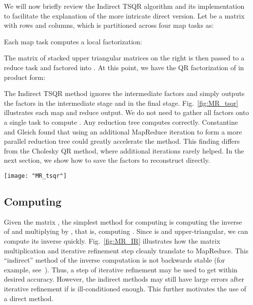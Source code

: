 \documentclass[10pt, conference, compsocconf]{IEEEtran}
\begin{document}
We will now briefly review the Indirect TSQR algorithm and its implementation to facilitate the explanation of the more intricate direct version.  Let  be a matrix with  rows and  columns, which is partitioned across four map tasks as:

Each map task computes a local  factorization:

The matrix of stacked upper triangular matrices on the right is then passed to a reduce task and factored into .  At this point, we have the QR factorization of  in product form: 

The Indirect TSQR method ignores the intermediate  factors and simply outputs the  factors  in the intermediate stage and  in the final stage.  Fig.~\ref{fig:MR_tsqr} illustrates each map and reduce output.  We do not need to gather all  factors onto a single task to compute .  Any reduction tree computes  correctly.  Constantine and Gleich found that using an additional MapReduce iteration to form a more parallel reduction tree could greatly accelerate the method. This finding differs from the Cholesky QR method, where additional iterations rarely helped. In the next section, we show how to save the  factors to reconstruct  directly.

\begin{figure*}
\centering
\texttt{[image: "MR\_tsqr"]}
\caption{MapReduce TSQR computation.   is the matrix consisting of the rows of the  factors stacked on top of each other, .  Similarly,  is the matrix consisting of the rows of the  factors stacked on top of each other, .}
\label{fig:MR_tsqr}
\end{figure*}

\subsection{Computing }
Given the matrix , the simplest method for computing  is computing the inverse of  and multiplying by , that is, computing .  Since  is  and upper-triangular, we can compute its inverse quickly. Fig.~\ref{fig:MR_IR} illustrates how the matrix multiplication and iterative refinement step cleanly translate to MapReduce.  This ``indirect'' method of the inverse computation is not backwards stable (for example, see~\cite{Stathopoulos2001-QR}).  Thus, a step of iterative refinement may be used to get  within desired accuracy.  However, the indirect methods may still have large errors after iterative refinement if  is ill-conditioned enough.  This further motivates the use of a direct method.
\end{document}
